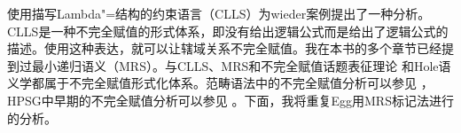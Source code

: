  \citet{Egg99a}使用描写Lambda"=结构的约束语言（CLLS）为wieder案例提出了一种分析。CLLS是一种不完全赋值的形式体系，即没有给出逻辑公式而是给出了逻辑公式的描述。使用这种表达，就可以让辖域关系不完全赋值。我在本书的多个章节已经提到过最小递归语义（MRS）\indexmrsc\citep*{CFPS2005a}。与CLLS、MRS和不完全赋值话题表征理论  \citep{Reyle93b-u,FR95a-u}和Hole语义学\citep{Bos96a-u,BB2005a}都属于不完全赋值形式化体系。范畴语法\indexcgc 中的不完全赋值分析可以参见  ，HPSG\indexhpsgc 中早期的不完全赋值分析可以参见 。下面，我将重复Egg用MRS标记法进行的分析。

